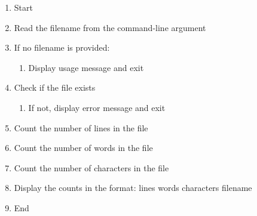 \begin{enumerate}
    \item Start
    \item Read the filename from the command-line argument
    \item If no filename is provided:
    \begin{enumerate}
        \item Display usage message and exit
    \end{enumerate}
    \item Check if the file exists
    \begin{enumerate}
        \item If not, display error message and exit
    \end{enumerate}
    \item Count the number of lines in the file
    \item Count the number of words in the file
    \item Count the number of characters in the file
    \item Display the counts in the format: lines words characters filename
    \item End
\end{enumerate}

